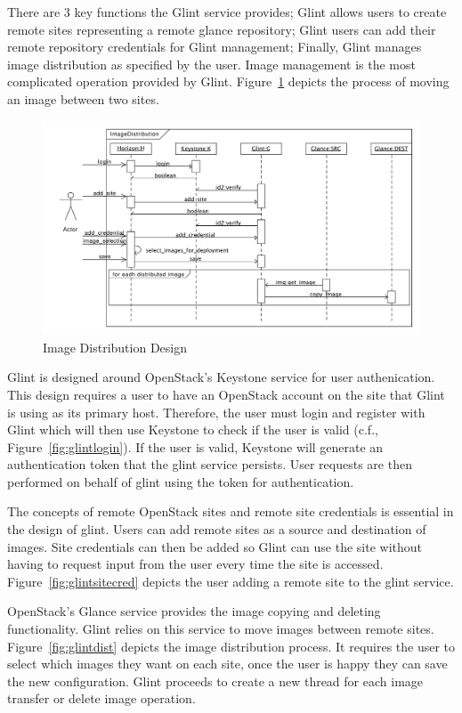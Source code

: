 \documentclass[a4paper]{jpconf}
\begin{document}
There are 3 key functions the Glint service provides; Glint allows users to create remote sites representing a remote glance repository; Glint users can add their remote repository credentials for Glint management; Finally, Glint manages image distribution as specified by the user. Image management is the most complicated operation provided by Glint. Figure~\ref{fig:glintseqdiag} depicts the process of moving an image between two sites. 

\begin{figure}[h]
\begin{center}
\includegraphics[width=36pc]{images/glintseqdiag.pdf}
\caption{\label{fig:glintseqdiag}Image Distribution Design}
\end{center}
\end{figure}

Glint is designed around OpenStack's Keystone service for user authenication. This design requires a user to have an OpenStack account on the site that Glint is using as its primary host. Therefore, the user must login and register with Glint which will then use Keystone to check if the user is valid (c.f., Figure~\ref{fig:glintlogin}). If the user is valid, Keystone will generate an authentication token that the glint service persists. User requests are then performed on behalf of glint using the token for authentication.

The concepts of remote OpenStack sites and remote site credentials is essential in the design of glint. Users can add remote sites as a source and destination of images. Site credentials can then be added so Glint can use the site without having to request input from the user every time the site is accessed. Figure~\ref{fig:glintsitecred} depicts the user adding a remote site to the glint service.

OpenStack's Glance service provides the image copying and deleting functionality. Glint relies on this service to move images between remote sites. Figure~\ref{fig:glintdist} depicts the image distribution process. It requires the user to select which images they want on each site, once the user is happy they can save the new configuration. Glint proceeds to create a new thread for each image transfer or delete image operation. 
\end{document}
